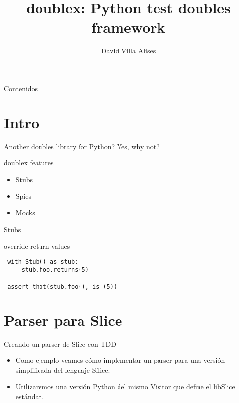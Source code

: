 \documentclass[11pt]{beamer}
\title{doublex: Python test doubles framework}
\author{David Villa Alises}
\date{}
\begin{document}
\begin{frame}
  \titlepage
\end{frame}

\begin{frame}{Contenidos}
  \tableofcontents
\end{frame}

\section{Intro}

\begin{frame}{Another doubles library for Python?}
  Yes, why not?
\end{frame}

\begin{frame}{doublex features}
  \begin{itemize}
  \item Stubs
  \item Spies
  \item Mocks
  \end{itemize}
\end{frame}

\begin{frame}[fragile]{Stubs}

\begin{exampleblock}{override return values}
\begin{lstlisting}
 with Stub() as stub:
     stub.foo.returns(5)

 assert_that(stub.foo(), is_(5))
\end{lstlisting}
\end{exampleblock}

\end{frame}



\section{Parser para Slice}

\begin{frame}[fragile]{Creando un parser de Slice con TDD}

  \begin{itemize}
  \item Como ejemplo veamos cómo implementar un parser para una versión simplificada del
    lenguaje Sílice.
  \item Utilizaremos una versión Python del mismo Visitor que define el libSlice estándar.
  \end{itemize}
\end{frame}
\end{document}
